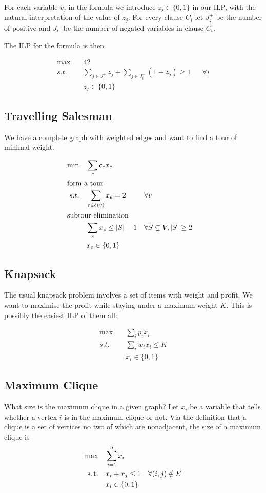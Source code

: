 For each variable $v_j$ in the formula we introduce $z_j \in \{0,1\}$ in our ILP, with the natural interpretation of the value of $z_j$. For every clause $C_i$ let $J^+_i$ be the number of positive and $J^-_i$ be the number of negated variables in clause $C_i$.

The ILP for the formula is then

\begin{align*}
\max \quad & 42 \\
s.t. &\sum_{j\in J^+_i} z_j + \sum_{j\in J^-_i} (1-z_j) \geq 1 && \forall i\\
&z_j \in \{0,1\}
\end{align*}

\subsection{Travelling Salesman}

We have a complete graph with weighted edges and want to find a tour of minimal weight.

\begin{align*}
\min \quad & \sum_e c_e x_e\\
\intertext{form a tour}
s.t. \quad & \sum_{e\in \delta(v)} x_e = 2 && \forall v\\
\intertext{subtour elimination}
	& \sum_e x_e \leq |S|-1 && \forall S \subsetneq V, |S|\geq 2\\ 
	& x_e \in \{0,1\}
\end{align*}

\subsection{Knapsack}

The usual knapsack problem involves a set of items with weight and profit. We want to maximise the profit while staying under a maximum weight $K$. This is possibly the easiest ILP of them all:

\begin{align*}
\max \quad & \sum_i p_ix_i\\
s.t.\quad & \sum_i w_i x_i \leq K\\
	& x_i\in \{0,1\}
\end{align*}

\subsection{Maximum Clique}

What size is the maximum clique in a given graph? Let $x_i$ be a variable that tells whether a vertex $i$ is in the maximum clique or not. Via the definition that a clique is a set of vertices no two of which are nonadjacent, the size of a maximum clique is
\begin{align*}
\max \quad & \sum_{i=1}^n x_i\\
\text{s.\,t.} \quad & x_i + x_j \leq 1 & \forall (i,j) \notin E\\
& x_i \in \{0,1\}
\end{align*}

